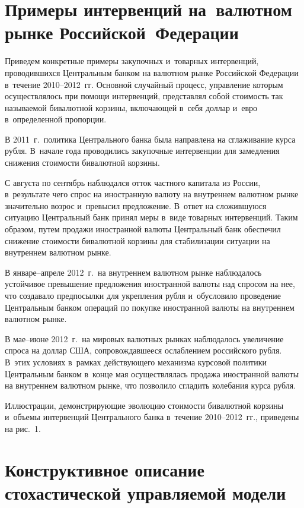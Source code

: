 \begin{multicols}{2}
\section{Примеры интервенций на~валютном рынке Российской~Федерации}

\vspace*{-3pt}

Приведем конкретные примеры закупочных и~товарных интервенций, проводившихся 
Цент\-раль\-ным банком на валютном рынке Российской Федерации в~течение 2010--2012~гг. 
Основной случайный процесс, управление которым осуществлялось при помощи 
интервенций, представлял собой стоимость так называемой бивалютной корзины, 
включающей в~себя доллар и~евро в~определенной пропорции.

В 2011~г.\ политика Центрального банка была направлена на сглаживание курса 
рубля. В~начале года проводились закупочные интервенции для замедления снижения 
стоимости бивалютной корзины.

С августа по сентябрь наблюдался отток частного капитала из России, в~результате 
чего спрос на иностранную валюту на внутреннем валютном рынке значительно возрос и~превысил предложение. В~ответ на сложившуюся ситуацию Центральный банк принял 
меры в~виде товарных интервенций. Таким образом, путем продажи иностранной 
валюты Центральный банк обеспечил снижение стоимости бивалютной корзины для 
стабилизации ситуации на внутреннем валютном рынке.




В январе--апреле 2012~г.\ на внутреннем валютном рынке наблюдалось устойчивое 
превышение предложения иностранной валюты над спросом на нее, что создавало 
предпосылки для укрепления рубля и~обусловило проведение Центральным банком 
операций по покупке иностранной валюты на внутреннем валютном рынке.


В мае--июне 2012~г.\ на мировых валютных рынках наблюдалось увеличение спроса 
на доллар США, сопровождавшееся ослаблением российского рубля. В~этих условиях 
в~рамках действующего механизма курсовой политики Центральным банком в~конце мая 
осуществлялась продажа иностранной валюты на внутреннем валютном рынке, что 
позволило сгладить колебания курса рубля.

Иллюстрации, демонстрирующие эволюцию стоимости бивалютной корзины и~объемы 
интервенций Центрального банка в~течение 2010--2012~гг., приведены на рис.~1.

\vspace*{-6pt}

\section{Конструктивное описание стохастической управляемой модели}


\end{multicols}
